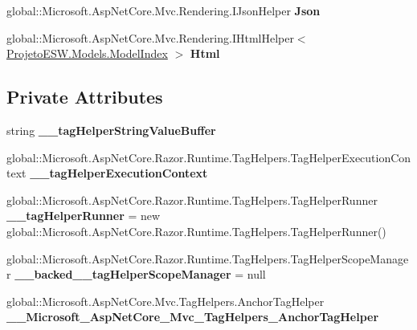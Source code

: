 \begin{DoxyCompactItemize}
\item 
\mbox{\label{class_asp_net_core_1_1_views___home___index_abf3abe76784a24e94008e7989f14c618}} 
global\+::\+Microsoft.\+Asp\+Net\+Core.\+Mvc.\+Rendering.\+I\+Json\+Helper {\bfseries Json}
\item 
\mbox{\label{class_asp_net_core_1_1_views___home___index_ad8c91217bc9bcd8ca8f751dc34061c7c}} 
global\+::\+Microsoft.\+Asp\+Net\+Core.\+Mvc.\+Rendering.\+I\+Html\+Helper$<$ \mbox{\hyperlink{class_projeto_e_s_w_1_1_models_1_1_model_index}{Projeto\+E\+S\+W.\+Models.\+Model\+Index}} $>$ {\bfseries Html}
\end{DoxyCompactItemize}
\subsection*{Private Attributes}
\begin{DoxyCompactItemize}
\item 
\mbox{\label{class_asp_net_core_1_1_views___home___index_a4dedd470b9f52f2656a570aff6274e59}} 
string {\bfseries \+\_\+\+\_\+tag\+Helper\+String\+Value\+Buffer}
\item 
\mbox{\label{class_asp_net_core_1_1_views___home___index_afc3e0b6cad65bcd2049f4441eb4a1627}} 
global\+::\+Microsoft.\+Asp\+Net\+Core.\+Razor.\+Runtime.\+Tag\+Helpers.\+Tag\+Helper\+Execution\+Context {\bfseries \+\_\+\+\_\+tag\+Helper\+Execution\+Context}
\item 
\mbox{\label{class_asp_net_core_1_1_views___home___index_a4f93b6f6e0ffa5f86d7345118e2edf29}} 
global\+::\+Microsoft.\+Asp\+Net\+Core.\+Razor.\+Runtime.\+Tag\+Helpers.\+Tag\+Helper\+Runner {\bfseries \+\_\+\+\_\+tag\+Helper\+Runner} = new global\+::\+Microsoft.\+Asp\+Net\+Core.\+Razor.\+Runtime.\+Tag\+Helpers.\+Tag\+Helper\+Runner()
\item 
\mbox{\label{class_asp_net_core_1_1_views___home___index_a0248c797f94a111e2223b83d687e106c}} 
global\+::\+Microsoft.\+Asp\+Net\+Core.\+Razor.\+Runtime.\+Tag\+Helpers.\+Tag\+Helper\+Scope\+Manager {\bfseries \+\_\+\+\_\+backed\+\_\+\+\_\+tag\+Helper\+Scope\+Manager} = null
\item 
\mbox{\label{class_asp_net_core_1_1_views___home___index_a432df4ff05e62808887655b02daf68aa}} 
global\+::\+Microsoft.\+Asp\+Net\+Core.\+Mvc.\+Tag\+Helpers.\+Anchor\+Tag\+Helper {\bfseries \+\_\+\+\_\+\+Microsoft\+\_\+\+Asp\+Net\+Core\+\_\+\+Mvc\+\_\+\+Tag\+Helpers\+\_\+\+Anchor\+Tag\+Helper}
\end{DoxyCompactItemize}
